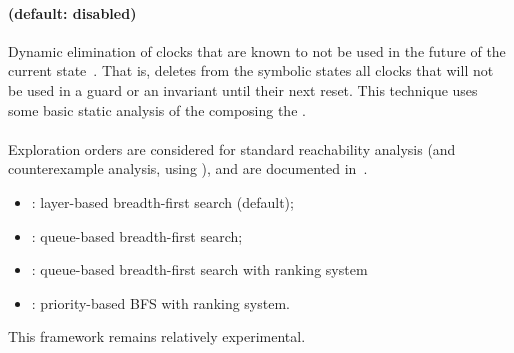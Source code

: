\paragraph{ (default: disabled)}
Dynamic elimination of clocks that are known to not be used in the future of the current state~\cite{Andre13FSFMA}.
That is, \imitator{} deletes from the symbolic states all clocks that will not be used in a guard or an invariant until their next reset.
This technique uses some basic static analysis of the \IPTA{} composing the \NIPTA{}.


\paragraph{ } %
Exploration orders are considered for standard reachability analysis (and counterexample analysis, using ), and are documented in~\cite{ANP17}.
\begin{itemize}
	\item {}: layer-based breadth-first search (default);
	\item {}: queue-based breadth-first search;
	\item {}: queue-based breadth-first search with ranking system
	\item {}: priority-based BFS with ranking system.
\end{itemize}
%
This framework remains relatively experimental.



